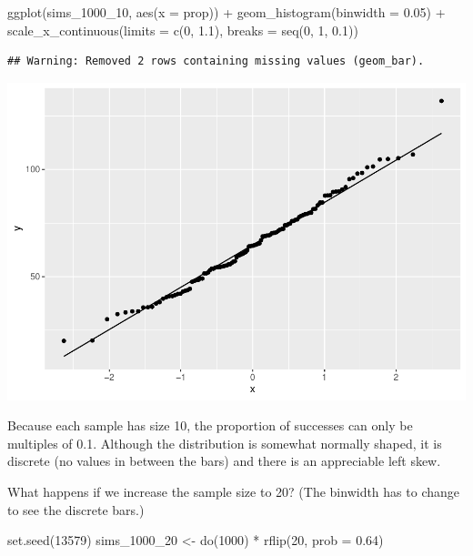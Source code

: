 \documentclass[
]{book}
\newenvironment{Shaded}{\begin{snugshade}}{\end{snugshade}}
\newcommand{\AttributeTok}[1]{\textcolor[rgb]{0.77,0.63,0.00}{#1}}
\newcommand{\DecValTok}[1]{\textcolor[rgb]{0.00,0.00,0.81}{#1}}
\newcommand{\FloatTok}[1]{\textcolor[rgb]{0.00,0.00,0.81}{#1}}
\newcommand{\FunctionTok}[1]{\textcolor[rgb]{0.00,0.00,0.00}{#1}}
\newcommand{\NormalTok}[1]{#1}
\newcommand{\OtherTok}[1]{\textcolor[rgb]{0.56,0.35,0.01}{#1}}
\newcommand{\SpecialCharTok}[1]{\textcolor[rgb]{0.00,0.00,0.00}{#1}}
\begin{document}
\begin{Shaded}
\begin{Highlighting}[]
\FunctionTok{ggplot}\NormalTok{(sims\_1000\_10, }\FunctionTok{aes}\NormalTok{(}\AttributeTok{x =}\NormalTok{ prop)) }\SpecialCharTok{+}
    \FunctionTok{geom\_histogram}\NormalTok{(}\AttributeTok{binwidth =} \FloatTok{0.05}\NormalTok{) }\SpecialCharTok{+}
    \FunctionTok{scale\_x\_continuous}\NormalTok{(}\AttributeTok{limits =} \FunctionTok{c}\NormalTok{(}\DecValTok{0}\NormalTok{, }\FloatTok{1.1}\NormalTok{),}
                       \AttributeTok{breaks =} \FunctionTok{seq}\NormalTok{(}\DecValTok{0}\NormalTok{, }\DecValTok{1}\NormalTok{, }\FloatTok{0.1}\NormalTok{))}
\end{Highlighting}
\end{Shaded}

\begin{verbatim}
## Warning: Removed 2 rows containing missing values (geom_bar).
\end{verbatim}

\includegraphics{intro_stats_files/figure-latex/unnamed-chunk-368-1.pdf}

Because each sample has size 10, the proportion of successes can only be multiples of 0.1. Although the distribution is somewhat normally shaped, it is discrete (no values in between the bars) and there is an appreciable left skew.

What happens if we increase the sample size to 20? (The binwidth has to change to see the discrete bars.)

\begin{Shaded}
\begin{Highlighting}[]
\FunctionTok{set.seed}\NormalTok{(}\DecValTok{13579}\NormalTok{)}
\NormalTok{sims\_1000\_20 }\OtherTok{\textless{}{-}} \FunctionTok{do}\NormalTok{(}\DecValTok{1000}\NormalTok{) }\SpecialCharTok{*} \FunctionTok{rflip}\NormalTok{(}\DecValTok{20}\NormalTok{, }\AttributeTok{prob =} \FloatTok{0.64}\NormalTok{)}
\end{Highlighting}
\end{Shaded}
\end{document}
